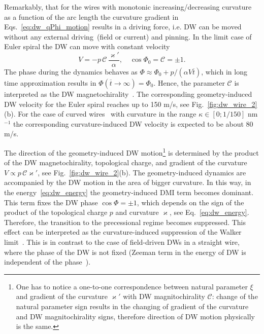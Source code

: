\documentclass[runningheads]{llncs}
\begin{document}
Remarkably, that for the wires with monotonic increasing/decreasing curvature as a function of the arc length the curvature gradient in Eqs.~\eqref{eq:dw_qPhi_motion} results in a driving force, i.e. DW can be moved without any external driving~(field or current) and pinning. In the limit case of Euler spiral the DW can move with constant velocity
\begin{equation}\label{eq:velocity_euler_spiral}
V=-p\,\mathcal{C}\,\frac{\varkappa'}{\alpha},\quad\cos\Phi_0=\mathcal{C}=\pm1.
\end{equation}
The phase during the dynamics behaves as $\Phi\approx\Phi_0+p/\left(\alpha V \overline{t}\right)$, which in long time approximation results in $\Phi\left(\overline{t}\to\infty\right)=\Phi_0$. Hence, the parameter $\mathcal{C}$ is interpreted as the DW magnetochirality~\cite{Kim14}.  The corresponding geometry-induced DW velocity for the Euler spiral reaches up to 150 m/s, see Fig.~\ref{fig:dw_wire_2}(b). For the case of curved wires~\cite{Lewis09,Nahrwold09,Wartelle18} with curvature in the range $\kappa\in\left[0;1/150\right]$ nm$^{-1}$ the corresponding curvature-induced DW velocity is expected to be about 80 m/s.

The direction of the geometry-induced DW motion\footnote{One has to notice a one-to-one correspondence between natural	parameter $\xi$ and gradient of the curvature $\varkappa'$ with DW magnitochirality $\mathcal{C}$: change of the natural parameter sign results in the changing of gradient of the curvature and DW magnitochirality	signs, therefore direction of DW motion physically is the same.} is determined by the product of the DW magnetochirality, topological charge, and gradient of the curvature $V\propto p\,\mathcal{C}\varkappa'$, see Fig.~\ref{fig:dw_wire_2}(b). The geometry-induced dynamics are accompanied by the DW motion in the area of bigger curvature. In this way, in the energy~\eqref{eq:dw_energy} the geometry-induced DMI term becomes dominant. This term fixes the DW phase $\cos\Phi=\pm1$, which depends on the sign of the product of the topological charge $p$ and curvature $\varkappa$, see Eq.~\eqref{eq:dw_energy}. Therefore, the transition to the precessional regime becomes suppressed. This effect can be interpreted as the curvature-induced suppression of the Walker limit~\cite{Yershov18a}. This is in contrast to the case of field-driven DWs in a straight wire, where the phase of the DW is not fixed (Zeeman term in the energy of DW is independent of the phase~\cite{Malozemoff79,Hillebrands06}).
\end{document}
